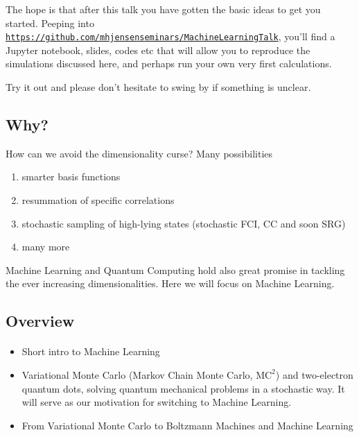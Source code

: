 \documentclass[%
oneside,                 %
final,                   %
10pt]{article}
\begin{document}
The hope is that after this talk you have gotten the basic ideas to get you started. Peeping into \href{{https://github.com/mhjensenseminars/MachineLearningTalk}}{\nolinkurl{https://github.com/mhjensenseminars/MachineLearningTalk}}, you'll find a Jupyter notebook, slides, codes etc that will allow you to reproduce the simulations discussed here, and perhaps run your own very first calculations.

Try it out and please don't hesitate to swing by if something is unclear.




\subsection{Why?}

How can we avoid the dimensionality curse? Many possibilities
\begin{enumerate}
\item smarter basis functions

\item resummation of specific correlations

\item stochastic sampling of high-lying states (stochastic FCI, CC and soon SRG)

\item many more
\end{enumerate}

\noindent
Machine Learning and Quantum Computing hold also great promise in tackling the 
ever increasing dimensionalities. Here we will focus on Machine Learning.


\subsection{Overview}

\paragraph{}
\begin{itemize}
\item Short intro to Machine Learning

\item Variational Monte Carlo (Markov Chain Monte Carlo, $\mathrm{MC}^2$) and two-electron quantum dots, solving quantum mechanical problems in a stochastic way. It  will serve as  our motivation for switching to Machine Learning. 

\item From Variational Monte Carlo to Boltzmann Machines and Machine Learning
\end{itemize}
\end{document}
